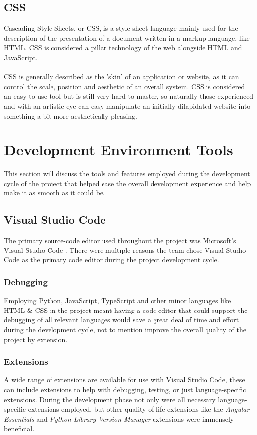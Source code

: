 \subsection{CSS}
Cascading Style Sheets, or CSS, is a style-sheet language mainly used for the description of the presentation of a document written in a markup language, like HTML. CSS is considered a pillar technology of the web alongside HTML and JavaScript.

\paragraph{}
CSS is generally described as the 'skin' of an application or website, as it can control the scale, position and aesthetic of an overall system. CSS is considered an easy to use tool but is still very hard to master, so naturally those experienced and with an artistic eye can easy manipulate an initially dilapidated website into something a bit more aesthetically pleasing.

\section{Development Environment Tools}
This section will discuss the tools and features employed during the development cycle of the project that helped ease the overall development experience and help make it as smooth as it could be.

\subsection{Visual Studio Code}
The primary source-code editor used throughout the project was Microsoft's Visual Studio Code \cite{VS_CODE}. There were multiple reasons the team chose Visual Studio Code as the primary code editor during the project development cycle.

\subsubsection{Debugging}
Employing Python, JavaScript, TypeScript and other minor languages like HTML \& CSS in the project meant having a code editor that could support the debugging of all relevant languages would save a great deal of time and effort during the development cycle, not to mention improve the overall quality of the project by extension.

\subsubsection{Extensions}
A wide range of extensions are available for use with Visual Studio Code, these can include extensions to help with debugging, testing, or just language-specific extensions. During the development phase not only were all necessary language-specific extensions employed, but other quality-of-life extensions like the \textit{Angular Essentials} and \textit{Python Library Version Manager} extensions \cite{EXTENSIONS} were immensely beneficial.

